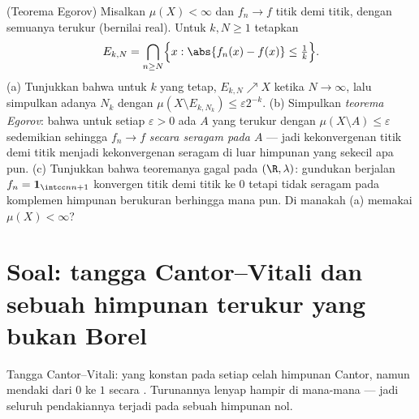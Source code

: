 \begin{exercise}[$\star\star\star$]\label{exo:b3:measure:12}
(Teorema Egorov) Misalkan $\mu(X) < \infty$ dan $f_n \to f$
titik demi titik, dengan semuanya terukur (bernilai real). Untuk $k, N \geq 1$
tetapkan
\[
E_{k,N} = \bigcap_{n \geq N}\Bigl\{x : \abs{f_n(x) - f(x)}
\leq \tfrac1k\Bigr\} .
\]
(a) Tunjukkan bahwa untuk $k$ yang tetap, $E_{k,N} \nearrow X$ ketika $N \to
\infty$, lalu simpulkan adanya $N_k$ dengan $\mu(X \setminus E_{k,N_k})
\leq \varepsilon2^{-k}$.
(b) Simpulkan \emph{teorema Egorov}: bahwa untuk setiap $\varepsilon
> 0$ ada $A$ yang terukur dengan $\mu(X\setminus A) \leq
\varepsilon$ sedemikian sehingga $f_n \to f$ \emph{secara seragam pada $A$}
--- jadi kekonvergenan titik demi titik menjadi kekonvergenan seragam di luar
himpunan yang sekecil apa pun.
(c) Tunjukkan bahwa teoremanya gagal pada $(\R, \lambda)$: gundukan
berjalan $f_n = \mathbf 1_{\intcc n{n+1}}$ konvergen titik demi titik
ke $0$ tetapi tidak seragam pada komplemen himpunan berukuran
berhingga mana pun. Di manakah (a) memakai $\mu(X) < \infty$?
\end{exercise}

\section{Soal: tangga Cantor--Vitali dan sebuah himpunan
terukur yang bukan Borel}

\begin{omfigure}

{\small Tangga Cantor--Vitali: yang konstan pada setiap celah
himpunan Cantor, namun mendaki dari $0$ ke $1$ secara .
Turunannya lenyap hampir di mana-mana --- jadi seluruh pendakiannya
terjadi pada sebuah himpunan nol.}
\end{omfigure}

